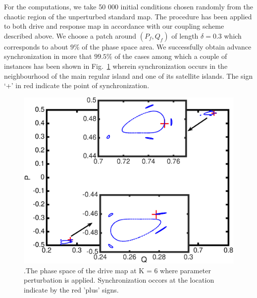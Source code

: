 \documentclass[preprint,showpacs,preprintnumbers,amsmath,amssymb]{revtex4-1}
\begin{document}
For the computations, we take 50 000 initial conditions chosen randomly from the chaotic region of the unperturbed standard map.  The procedure has been applied to both drive and response map in accordance with our coupling  scheme described above. We choose a patch around $(P_f,Q_f)$  of length $\delta= 0.3$ which corresponds to about $9\%$ of the phase space area. We successfully obtain advance synchronization in more that $99.5\%$ of the cases among which a  couple of instances  has been shown in Fig.~\ref{fig:location} wherein synchronization occurs in the neighbourhood of the main regular island and one of its satellite islands.  The sign `+' in red indicate the point of synchronization. 
 \begin{figure}[h]
\includegraphics[scale=0.6]{Fast_sync_location.eps}
\caption{\label{fig:location} \footnotesize.The phase space of the drive map 
at K = 6 where parameter perturbation is applied. Synchronization occors at 
the location indicate by the red 'plus' signs.}
\end{figure}
 
\end{document}
